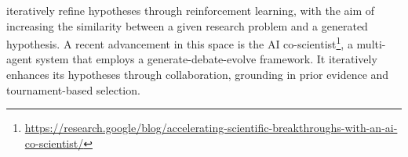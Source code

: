     \citet{zhou2024hypothesis} iteratively refine hypotheses through reinforcement learning, with the aim 
    of 
    increasing the similarity between a given research problem and a generated hypothesis. A recent advancement in this space is the AI co-scientist\footnote{\url{https://research.google/blog/accelerating-scientific-breakthroughs-with-an-ai-co-scientist/}}, a multi-agent system that employs a generate-debate-evolve framework. It iteratively enhances its hypotheses through collaboration, grounding in prior evidence and tournament-based selection.
    

\iffalse 
Additionally, %
\citet{liu2024literature} discuss data sources that LLMs rely on to generate hypotheses. For instance, scientific literature is provided as a source of model input for LLMs to generate hypotheses. Additionally, LLMs take as model input a paper review and generate testable hypotheses regarding whether the review is written by Generative AI. %
\citet{yang2023large} propose to incorporate web data (e.g., scientific comments on social media) into the hypothesis generation process. This allows hypotheses to be informed by public opinions.
\fi





